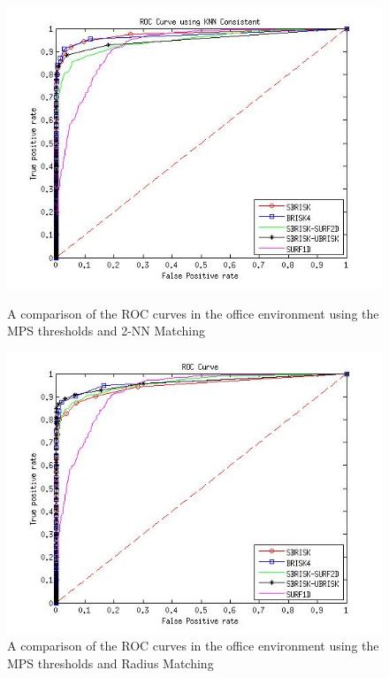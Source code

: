 \begin{figure}[h!]
\begin{minipage}[b]{0.5\linewidth}
\includegraphics[scale=0.4]{../Drawings/dataset2_ROC_General_KNN.jpg}
\caption{A comparison of the ROC curves in the office environment using the MPS thresholds and 2-NN Matching}
\label{fig:compareKnnOffice}
\end{minipage}
\hspace{0.5cm}
\begin{minipage}[b]{0.5\linewidth}
\includegraphics[scale=0.4]{../Drawings/dataset2_ROC_General_Hamming.jpg}
\caption{A comparison of the ROC curves in the office environment using the MPS thresholds and Radius Matching}
\label{fig:compareHammingOffice}
\end{minipage}

\end{figure}


